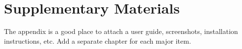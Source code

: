 \documentclass[language=english,titlepage=false,smartquotes=true]{hgbreport}
\begin{document}
\appendix                                                   %

\chapter{Supplementary Materials}

The appendix is a good place to attach a user guide, screenshots, installation
instructions, etc. Add a separate chapter for each major item.

\MakeBibliography[nosplit]

\end{document}
